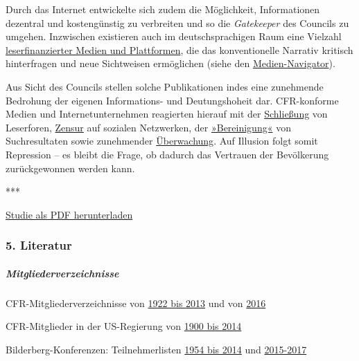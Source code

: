 Durch das Internet entwickelte sich zudem die Möglichkeit, Informationen
dezentral und kostengünstig zu verbreiten und so die \emph{Gatekeeper}
des Councils zu umgehen. Inzwischen existieren auch im
deutsch­sprachigen Raum eine Vielzahl
\href{https://swprs.org/medien-navigator/}{leserfinanzierter Medien und
Plattformen}, die das konventionelle Narrativ kritisch hinterfragen und
neue Sichtweisen ermöglichen (siehe den
\href{https://swprs.org/medien-navigator/}{Medien-Navigator}).

Aus Sicht des Councils stellen solche Publikationen indes eine
zunehmende Bedrohung der eigenen Informations- und Deutungs­hoheit dar.
CFR-konforme Medien und Internet­unternehmen reagierten hierauf mit der
\href{https://www.heise.de/tp/features/Konzentriertes-Gejammer-NZZ-schliesst-Kommentarspalte-3618957.html}{Schließung}
von Leserforen,
\href{https://www.heise.de/tp/features/Facebook-Fake-News-und-die-Privatisierung-der-Zensur-3599878.html}{Zensur}
auf sozialen Netzwerken, der
\href{https://www.wsws.org/de/articles/2017/10/03/goog-o03.html}{»Bereinigung«}
von Suchresultaten sowie zunehmender
\href{https://www.humanrights.ch/de/menschenrechte-schweiz/inneres/person/sicherheit/schweizer-nachrichtendienstgesetz}{Überwachung}.
Auf Illusion folgt somit Repression -- es bleibt die Frage, ob dadurch
das Vertrauen der Bevölkerung zurückgewonnen werden kann.

***

\href{https://swprs.files.wordpress.com/2018/07/die-propaganda-matrix-spr-hdv.pdf}{Studie
als PDF herunterladen}

\hypertarget{5-literatur}{%
\subsubsection{5. Literatur}\label{5-literatur}}

\hypertarget{mitgliederverzeichnisse}{%
\subparagraph{\texorpdfstring{\textbf{Mitgliederverzeichnisse}}{Mitgliederverzeichnisse}}\label{mitgliederverzeichnisse}}

CFR-Mitgliederverzeichnisse von
\href{https://swprs.files.wordpress.com/2017/07/council-on-foreign-relations-membership-rosters-1922-2013.pdf}{1922
bis 2013} und von
\href{https://swprs.files.wordpress.com/2017/07/cfr-members-2016.pdf}{2016}

CFR-Mitglieder in der US-Regierung von
\href{https://swprs.files.wordpress.com/2017/07/cfr-administration-members-1900-2014.pdf}{1900
bis 2014}

Bilderberg-Konferenzen: Teilnehmerlisten
\href{https://swprs.files.wordpress.com/2016/07/bilderberg_teilnehmer_1954-2014.pdf}{1954
bis 2014} und
\href{http://www.bilderbergmeetings.org/latest-meetings.html}{2015-2017}

